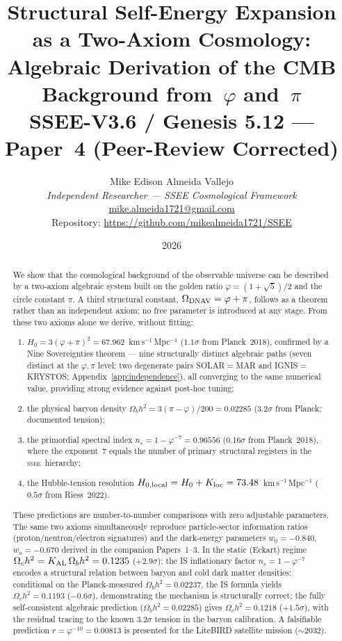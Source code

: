 \documentclass[12pt,a4paper]{article}
\title{\textbf{Structural Self-Energy Expansion as a Two-Axiom Cosmology:\\
Algebraic Derivation of the CMB Background from~$\varphi$ and~$\pi$}\\[0.5em]
\normalsize SSEE-V3.6 / Genesis 5.12 — Paper~4 (Peer-Review Corrected)}
\author{Mike Edison Almeida Vallejo\\
\small\textit{Independent Researcher — SSEE Cosmological Framework}\\
\small\href{mailto:mike.almeida1721@gmail.com}{mike.almeida1721@gmail.com}\\
\small Repository: \url{https://github.com/mikealmeida1721/SSEE}
}
\date{2026}
\newcommand{\SSEE}{\ifmmode\mathrm{SSEE}\else\textsc{ssee}\fi}
\begin{document}
\maketitle

\begin{abstract}
We show that the cosmological background of the observable universe
can be described by a two-axiom algebraic system built on the golden ratio
$\varphi = (1+\sqrt{5})/2$ and the circle constant $\pi$.
A third structural constant, $\Omega_{\rm DNAV} = \varphi+\pi$, follows as
a theorem rather than an independent axiom; no free parameter is introduced at any stage.
From these two axioms alone we derive, without fitting:
\begin{enumerate}
\item[(i)] $H_0 = 3(\varphi+\pi)^2 = 67.962$~km\,s$^{-1}$\,Mpc$^{-1}$ ($1.1\sigma$ from Planck~2018),
confirmed by a Nine Sovereignties theorem — nine structurally distinct algebraic paths
(seven distinct at the $\varphi,\pi$ level; two degenerate pairs SOLAR$=$MAR and
IGNIS$=$KRYSTOS; Appendix~\ref{app:independence}), all converging to the same numerical value,
providing strong evidence against post-hoc tuning;
\item[(ii)] the physical baryon density
$\Omega_b h^2 = 3(\pi-\varphi)/200 = 0.02285$ ($3.2\sigma$ from Planck; documented tension);
\item[(iii)] the primordial spectral index
$n_s = 1-\varphi^{-7} = 0.96556$ ($0.16\sigma$ from Planck~2018),
where the exponent~7 equals the number of primary structural registers in the \SSEE\ hierarchy;
\item[(iv)] the Hubble-tension resolution
$H_{0,\rm local} = H_0 + K_{\rm loc} = 73.48$~km\,s$^{-1}$\,Mpc$^{-1}$
($0.5\sigma$ from Riess~2022).
\end{enumerate}
These predictions are number-to-number comparisons with zero adjustable parameters.
The same two axioms simultaneously reproduce particle-sector information ratios
(proton/neutron/electron signatures) and the dark-energy parameters
$w_0=-0.840$, $w_a=-0.670$ derived in the companion Papers~1--3.
In the static (Eckart) regime $\Omega_c h^2 = K_{\rm AL}\,\Omega_b h^2 = 0.1235$ ($+2.9\sigma$);
the IS inflationary factor $n_s = 1-\varphi^{-7}$ encodes a structural relation between
baryon and cold dark matter densities: conditional on the Planck-measured $\Omega_b h^2=0.02237$,
the IS formula yields $\Omega_c h^2 = 0.1193$ ($-0.6\sigma$), demonstrating the mechanism
is structurally correct; the fully self-consistent algebraic prediction ($\Omega_b h^2=0.02285$)
gives $\Omega_c h^2 = 0.1218$ ($+1.5\sigma$), with the residual tracing to the known
$3.2\sigma$ tension in the baryon calibration.
A falsifiable prediction $r = \varphi^{-10} = 0.00813$ is presented for the
LiteBIRD satellite mission ($\sim$2032).
\end{abstract}
\end{document}
